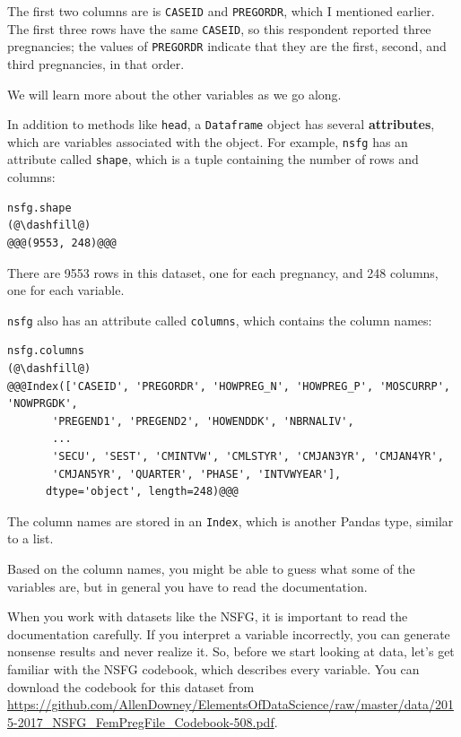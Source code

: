 The first two columns are is \passthrough{\lstinline!CASEID!} and
\passthrough{\lstinline!PREGORDR!}, which I mentioned earlier. The first
three rows have the same \passthrough{\lstinline!CASEID!}, so this
respondent reported three pregnancies; the values of
\passthrough{\lstinline!PREGORDR!} indicate that they are the first,
second, and third pregnancies, in that order.

We will learn more about the other variables as we go along.

In addition to methods like \passthrough{\lstinline!head!}, a
\passthrough{\lstinline!Dataframe!} object has several
\textbf{attributes}, which are variables associated with the object. For
example, \passthrough{\lstinline!nsfg!} has an attribute called
\passthrough{\lstinline!shape!}, which is a tuple containing the number
of rows and columns:

\begin{lstlisting}[]
nsfg.shape
(@\dashfill@)
@@@(9553, 248)@@@
\end{lstlisting}

There are 9553 rows in this dataset, one for each pregnancy, and 248
columns, one for each variable.

\passthrough{\lstinline!nsfg!} also has an attribute called
\passthrough{\lstinline!columns!}, which contains the column names:

\begin{lstlisting}[]
nsfg.columns
(@\dashfill@)
@@@Index(['CASEID', 'PREGORDR', 'HOWPREG_N', 'HOWPREG_P', 'MOSCURRP', 'NOWPRGDK',
       'PREGEND1', 'PREGEND2', 'HOWENDDK', 'NBRNALIV',
       ...
       'SECU', 'SEST', 'CMINTVW', 'CMLSTYR', 'CMJAN3YR', 'CMJAN4YR',
       'CMJAN5YR', 'QUARTER', 'PHASE', 'INTVWYEAR'],
      dtype='object', length=248)@@@
\end{lstlisting}

The column names are stored in an \passthrough{\lstinline!Index!}, which
is another Pandas type, similar to a list.

Based on the column names, you might be able to guess what some of the
variables are, but in general you have to read the documentation.

When you work with datasets like the NSFG, it is important to read the
documentation carefully. If you interpret a variable incorrectly, you
can generate nonsense results and never realize it. So, before we start
looking at data, let's get familiar with the NSFG codebook, which
describes every variable. You can download the codebook for this dataset
from
\url{https://github.com/AllenDowney/ElementsOfDataScience/raw/master/data/2015-2017_NSFG_FemPregFile_Codebook-508.pdf}.

